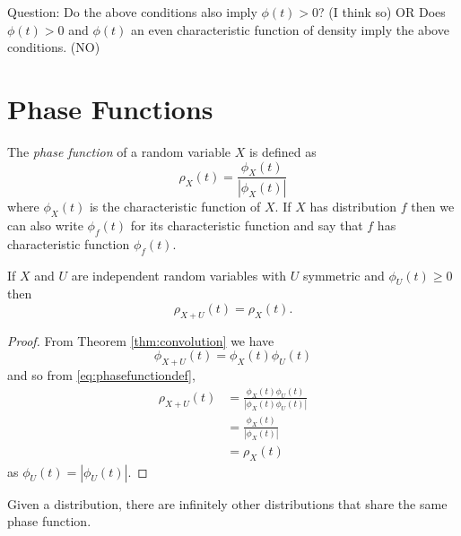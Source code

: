 Question: Do the above conditions also imply $\phi(t) > 0$? (I think so) OR Does $\phi(t) > 0$ and $\phi(t)$ an even characteristic function of density imply the above conditions. (NO)


	

\section{Phase Functions}
The \emph{phase function} of a random variable $X$ is defined as 
\begin{equation}
	\rho_X(t) = \frac{\phi_X(t)}{|\phi_X(t)|}
	\label{eq:phasefunctiondef}
\end{equation}
where $\phi_X(t)$ is the characteristic function of $X$. If $X$ has distribution $f$ then we can also write $\phi_f(t)$ for its characteristic function and say that $f$ has characteristic function $\phi_f(t)$.

\begin{theorem}
	If $X$ and $U$ are independent random variables with $U$ symmetric and $\phi_U(t) \geq 0$ then
	\begin{equation}
		\rho_{X+U}(t) = \rho_X(t).
	\end{equation}
	\label{thm:phasefunctionaddsymmetric}
\end{theorem}
\begin{proof}
	From Theorem \ref{thm:convolution} we have
	$$\phi_{X+U}(t) = \phi_X(t)\phi_U(t)$$
	and so from \eqref{eq:phasefunctiondef},
	\begin{align*}
		\rho_{X+U}(t) &= \frac{\phi_X(t)\phi_U(t)}{|\phi_X(t)\phi_U(t)|}\\
							&= \frac{\phi_X(t)}{|\phi_X(t)|}\\
							&= \rho_X(t)
	\end{align*}
	as $\phi_U(t) = |\phi_U(t)|$.
\end{proof}

\begin{corollary}
	Given a distribution, there are infinitely other distributions that share the same phase function.
\end{corollary}




